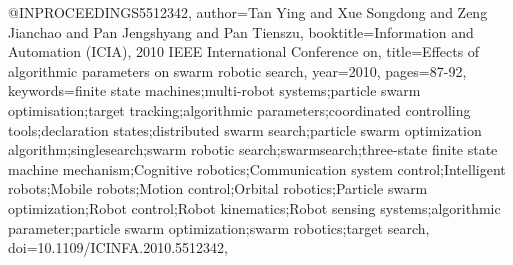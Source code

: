 \documentclass[journal]{IEEEtran}
\begin{document}
\begin{thebibliography}{1}
@INPROCEEDINGS{5512342,
author={Tan Ying and Xue Songdong and Zeng Jianchao and Pan Jengshyang and Pan Tienszu},
booktitle={Information and Automation (ICIA), 2010 IEEE International Conference on}, title={Effects of algorithmic parameters on swarm robotic search},
year={2010},
pages={87-92},
keywords={finite state machines;multi-robot systems;particle swarm optimisation;target tracking;algorithmic parameters;coordinated controlling tools;declaration states;distributed swarm search;particle swarm optimization algorithm;singlesearch;swarm robotic search;swarmsearch;three-state finite state machine mechanism;Cognitive robotics;Communication system control;Intelligent robots;Mobile robots;Motion control;Orbital robotics;Particle swarm optimization;Robot control;Robot kinematics;Robot sensing systems;algorithmic parameter;particle swarm optimization;swarm robotics;target search},
doi={10.1109/ICINFA.2010.5512342},}
\end{thebibliography}
\end{document}
